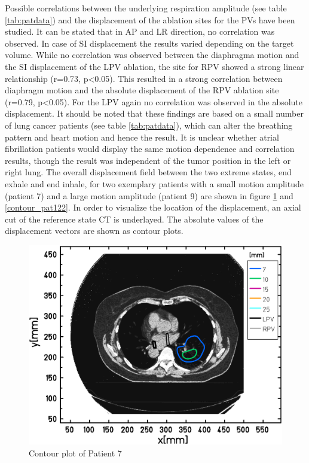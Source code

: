 Possible correlations between the underlying respiration amplitude (see table \ref{tab:patdata}) and the displacement of the ablation sites 
for the PVs have been studied. It can be stated that in AP and LR direction, no correlation was observed. In case of SI displacement the 
results varied depending on the target volume. While no correlation was observed between the diaphragma motion and the SI displacement of the 
LPV ablation, the site for RPV showed a strong linear relationship (r=0.73, p<0.05). This resulted in a strong correlation between  
diaphragm motion and the absolute displacement of the RPV ablation site (r=0.79, p<0.05). For the LPV again no correlation was observed in the 
absolute displacement. \newline
\newline
It should be noted that these findings are based on a small number of lung cancer patients (see table \ref{tab:patdata}), which can alter the 
breathing pattern and heart motion and hence the result. It is unclear whether atrial fibrillation patients would display the same motion 
dependence and correlation results, though the result was independent of the tumor position in the left or right lung. 
\newpage
The overall displacement field between the two extreme states, end exhale and end inhale, for two exemplary patients with a small motion 
amplitude (patient 7) and a large motion amplitude (patient 9) are shown in figure \ref{contour_pat036} and \ref{contour_pat122}. In order to 
visualize the location of the displacement, an axial cut of the reference state CT is underlayed. The absolute values of the displacement 
vectors are shown as contour plots. 

\begin{figure}[H]
\begin{center}
 \includegraphics[scale=0.22]{./teile/results_mdacc/Contour_z_abs_RESP_Pat037_HUSkala_gedreht_2.png}
\caption{Contour plot of Patient 7}
\label{contour_pat036}
\end{center}
\end{figure}


